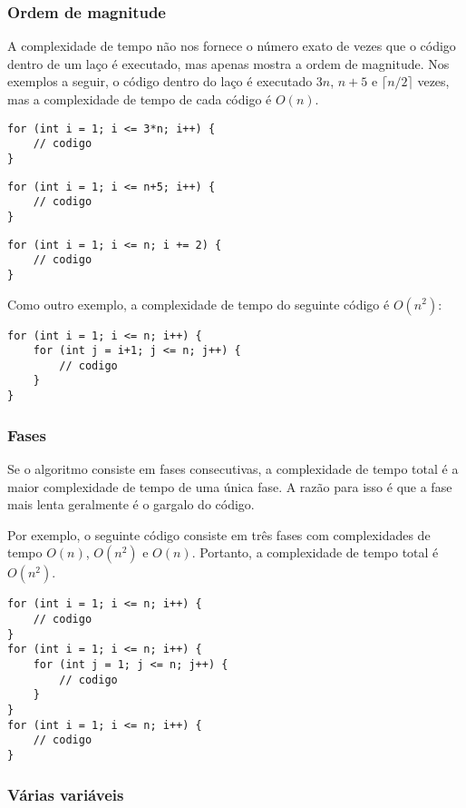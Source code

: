 \subsubsection*{Ordem de magnitude}

A complexidade de tempo não nos fornece o número exato
de vezes que o código dentro de um laço é executado,
mas apenas mostra a ordem de magnitude.
Nos exemplos a seguir, o código dentro do laço
é executado $3n$, $n+5$ e $\lceil n/2 \rceil$ vezes,
mas a complexidade de tempo de cada código é $O(n)$.

\begin{lstlisting}
for (int i = 1; i <= 3*n; i++) {
    // codigo
}
\end{lstlisting}

\begin{lstlisting}
for (int i = 1; i <= n+5; i++) {
    // codigo
}
\end{lstlisting}

\begin{lstlisting}
for (int i = 1; i <= n; i += 2) {
    // codigo
}
\end{lstlisting}

Como outro exemplo, 
a complexidade de tempo do seguinte código é $O(n^2)$:

\begin{lstlisting}
for (int i = 1; i <= n; i++) {
    for (int j = i+1; j <= n; j++) {
        // codigo
    }
}
\end{lstlisting}

\subsubsection*{Fases}

Se o algoritmo consiste em fases consecutivas,
a complexidade de tempo total é a maior
complexidade de tempo de uma única fase.
A razão para isso é que a fase mais lenta
geralmente é o gargalo do código.

Por exemplo, o seguinte código consiste
em três fases com complexidades de tempo
$O(n)$, $O(n^2)$ e $O(n)$.
Portanto, a complexidade de tempo total é $O(n^2)$.

\begin{lstlisting}
for (int i = 1; i <= n; i++) {
    // codigo
}
for (int i = 1; i <= n; i++) {
    for (int j = 1; j <= n; j++) {
        // codigo
    }
}
for (int i = 1; i <= n; i++) {
    // codigo
}
\end{lstlisting}

\subsubsection*{Várias variáveis}

